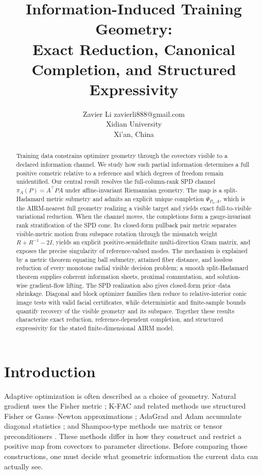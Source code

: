 \documentclass[10pt]{article}
\title{Information-Induced Training Geometry:\\
Exact Reduction, Canonical Completion, and Structured Expressivity}
\author{\name Zavier Li \email zavierli888@gmail.com\\
      \addr Xidian University\\
      \addr Xi'an, China}
\theoremstyle{plain}
\theoremstyle{definition}
\theoremstyle{remark}
\begin{document}
\maketitle

\begin{abstract}
Training data constrains optimizer geometry through the covectors visible to
a declared information channel.  We study how such partial information
determines a full positive cometric relative to a reference and which degrees
of freedom remain unidentified.  Our central result resolves the
full-column-rank SPD channel
\(\pi_A(P)=A^\top P A\) under affine-invariant Riemannian geometry.  The map
is a split-Hadamard metric submetry and admits an explicit unique completion
\(\Psi_{P_0,A}\), which is the AIRM-nearest full geometry realizing a visible
target and yields exact full-to-visible variational reduction.  When the
channel moves, the completions form a gauge-invariant rank stratification of
the SPD cone.  Its closed-form pullback pair metric separates visible-metric
motion from subspace rotation through the mismatch weight
\(R+R^{-1}-2I\), yields an explicit positive-semidefinite multi-direction Gram
matrix, and exposes the precise singularity of reference-valued modes.  The
mechanism is explained by a metric theorem equating ball
submetry, attained fiber distance, and lossless reduction of every monotone
radial visible decision problem; a smooth split-Hadamard theorem supplies
coherent information sheets, proximal commutation, and solution-wise
gradient-flow lifting.  The SPD realization also gives closed-form
prior--data shrinkage.  Diagonal
and block optimizer families then reduce to relative-interior conic image
tests with valid facial certificates, while deterministic and finite-sample
bounds quantify recovery of the visible geometry and its subspace.  Together
these results characterize exact reduction, reference-dependent completion,
and structured expressivity for the stated finite-dimensional AIRM model.
\end{abstract}

\section{Introduction}
\label{sec:introduction}

Adaptive optimization is often described as a choice of geometry.  Natural
gradient uses the Fisher metric \citep{amari1998natural}; K-FAC and related
methods use structured Fisher or Gauss--Newton approximations
\citep{martens2015kfac,george2018ekfac}; AdaGrad and Adam accumulate diagonal
statistics \citep{duchi2011adagrad,kingma2014adam}; and Shampoo-type methods
use matrix or tensor preconditioners
\citep{gupta2018shampoo,morwani2024shampoo}.  These methods differ in how they
construct and restrict a positive map from covectors to parameter directions.
Before comparing those constructions, one must decide what geometric
information the current data can actually see.
\end{document}

